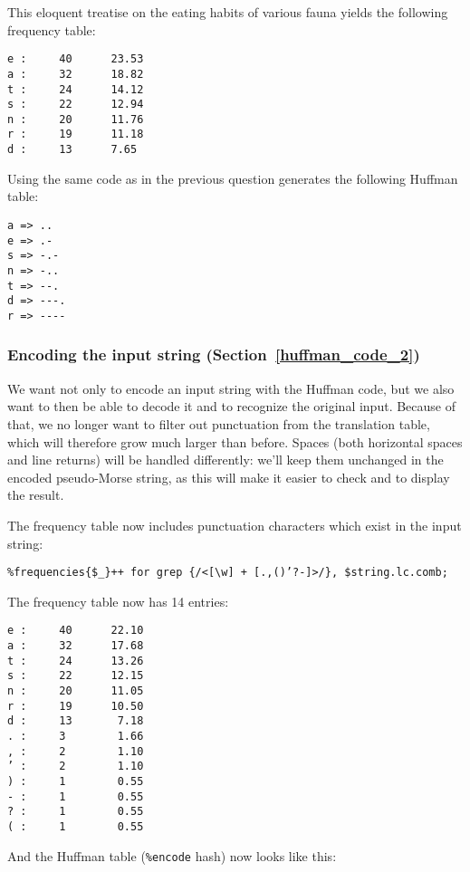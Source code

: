 This eloquent treatise on the eating habits of various fauna 
yields the following frequency table:

\begin{verbatim}
e :     40      23.53
a :     32      18.82
t :     24      14.12
s :     22      12.94
n :     20      11.76
r :     19      11.18
d :     13      7.65
\end{verbatim}

Using the same code as in the previous question generates the 
following Huffman table:

\begin{verbatim}
a => ..
e => .-
s => -.-
n => -..
t => --.
d => ---.
r => ----
\end{verbatim}

\subsubsection{Encoding the input string (Section~\ref{huffman_code_2})}

We want not only to encode an input string with the Huffman code, but 
we also want to then be able to decode it and to recognize the original 
input. Because of that, we no longer want to filter out punctuation  
from the translation table, which will therefore grow much larger than 
before. Spaces (both horizontal spaces and line returns) will be handled 
differently: we'll keep them unchanged in the encoded pseudo-Morse 
string, as this will make it easier to check and to display the result.

The frequency table now includes punctuation characters which exist 
in the input string:

\begin{verbatim}
%frequencies{$_}++ for grep {/<[\w] + [.,()’?-]>/}, $string.lc.comb;
\end{verbatim}

The frequency table now has 14 entries:

\begin{verbatim}
e :     40      22.10
a :     32      17.68
t :     24      13.26
s :     22      12.15
n :     20      11.05
r :     19      10.50
d :     13       7.18
. :     3        1.66
, :     2        1.10
’ :     2        1.10
) :     1        0.55
- :     1        0.55
? :     1        0.55
( :     1        0.55
\end{verbatim}

And the Huffman table (\verb'%encode' hash) now looks like this:

